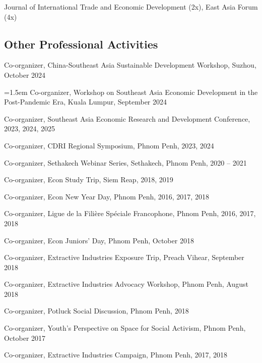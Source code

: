 \documentclass[10pt,a4paper]{article}
\begin{document}
Journal of International Trade and Economic Development (2x), East Asia Forum (4x)


\subsection*{Other Professional Activities}

Co-organizer, China-Southeast Asia Sustainable Development Workshop, Suzhou, October 2024

\hangindent=1.5em
Co-organizer, Workshop on Southeast Asia Economic Development in the Post-Pandemic Era, Kuala Lumpur, September 2024

Co-organizer, Southeast Asia Economic Research and Development Conference, 2023, 2024, 2025

Co-organizer, CDRI Regional Symposium, Phnom Penh, 2023, 2024

Co-organizer, Sethakech Webinar Series, Sethakech, Phnom Penh, 2020 -- 2021

Co-organizer, Econ Study Trip, Siem Reap, 2018, 2019

Co-organizer, Econ New Year Day, Phnom Penh, 2016, 2017, 2018

Co-organizer, Ligue de la Filière Spéciale Francophone, Phnom Penh, 2016, 2017, 2018

Co-organizer, Econ Juniors' Day, Phnom Penh, October 2018

Co-organizer, Extractive Industries Exposure Trip, Preach Vihear, September 2018

Co-organizer, Extractive Industries Advocacy Workshop, Phnom Penh, August 2018

Co-organizer, Potluck Social Discussion, Phnom Penh, 2018

Co-organizer, Youth's Perspective on Space for Social Activism, Phnom Penh, October 2017

Co-organizer, Extractive Industries Campaign, Phnom Penh, 2017, 2018



\end{document}
